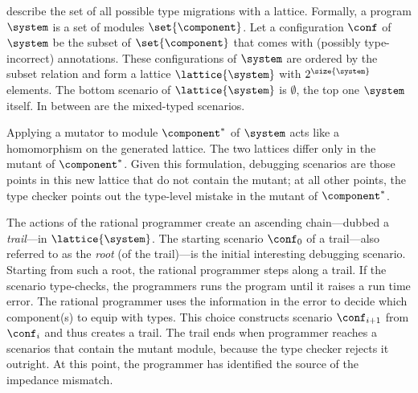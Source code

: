 

\citet{tfgnvf-popl-2016} describe the set of all possible type migrations with a
lattice. Formally, a program $\system$ is a set of modules $\set{\component}$.
Let a configuration $\conf$ of $\system$ be the subset of $\set{\component}$ that
comes with (possibly type-incorrect) annotations. These configurations of
$\system$ are ordered by the subset relation and form a lattice
$\lattice{\system}$ with $2^{\size{\system}}$ elements. The bottom scenario of
$\lattice{\system}$ is $\emptyset$, the top one $\system$ itself. In between are
the mixed-typed scenarios.

Applying a mutator to module $\component^*$ of $\system$ acts like a homomorphism
on the generated lattice. The two lattices differ only in the mutant of
$\component^*$. Given this formulation, debugging scenarios are those points in
this new lattice that do not contain the mutant; at all other points, the type
checker points out the type-level mistake in the mutant of $\component^*$.

The actions of the rational programmer create an ascending chain---dubbed a
\emph{trail}---in $\lattice{\system}$.  The starting scenario $\conf_0$ of a
trail---also referred to as the \emph{root} (of the trail)---is the initial
interesting debugging scenario.  Starting from such a root, the rational
programmer steps along a trail. If the scenario type-checks, the programmers runs
the program until it raises a run time error.  The rational programmer uses the
information in the error to decide which component(s) to equip with types. This
choice constructs scenario $\conf_{i+1}$ from $\conf_{i}$ and thus creates a
trail. The trail ends when programmer reaches a scenarios that contain the mutant
module, because the type checker rejects it outright. At this point, the
programmer has identified the source of the impedance mismatch.
